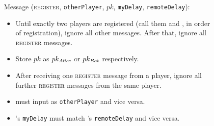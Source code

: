 \begin{figure}[H]
  \begin{systembox}{\fch}
    Message (\textsc{register}, \texttt{otherPlayer}, $pk$, \texttt{myDelay},
    \texttt{remoteDelay}):
      \begin{itemize}
        \item Until exactly two players are registered (call them \alice{} and
        \bob, in order of registration), ignore all other messages. After that,
        ignore all \textsc{register} messages.
        \item Store $pk$ as $pk_{\mathit{Alice}}$ or $pk_{\mathit{Bob}}$ respectively.
        \item After receiving one \textsc{register} message from a player,
        ignore all further \textsc{register} messages from the same player.
        \item \alice{} must input \bob{} as \texttt{otherPlayer} and vice versa.
        \item \alice's \texttt{myDelay} must match \bob's \texttt{remoteDelay}
        and vice versa.
      \end{itemize}


\end{systembox}
\end{figure}
